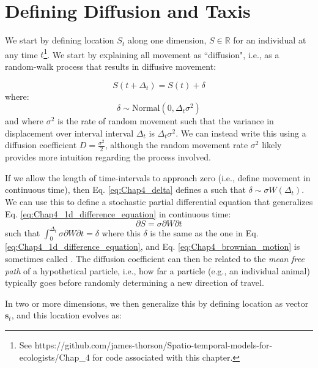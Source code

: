\section{Defining Diffusion and Taxis} \label{sec:Chap4_diffusion_and_taxis}

We start by defining location \(S_t\) along one dimension, \(S \in \mathbb{R}\) for an individual at any time \(t\)\footnote{See https://github.com/james-thorson/Spatio-temporal-models-for-ecologists/Chap\_4 for code associated with this chapter.}. We start by explaining all movement as ``diffusion", i.e., as a random-walk process that results in diffusive movement:

\begin{equation} \label{eq:Chap4_1d_difference_equation}
    S(t+\Delta_t) = S(t) + \delta    
\end{equation}
where:
\begin{equation} \label{eq:Chap4_delta}
    \delta \sim \mathrm{Normal}(0, \Delta_t \sigma^2)    
\end{equation}
and where \(\sigma^2\) is the rate of random movement such that the variance in displacement over interval interval \(\Delta_t\) is \(\Delta_t \sigma^2\).  We can instead write this using a diffusion coefficient \(D = \frac{\sigma^2}{2}\), although the random movement rate \(\sigma^2\) likely provides more intuition regarding the process involved.   

If we allow the length of time-intervals to approach zero (i.e., define movement in continuous time), then Eq. \ref{eq:Chap4_delta} defines a  such that \( \delta \sim \sigma W(\Delta_t) \).  We can use this to define a stochastic partial differential equation that generalizes Eq. \ref{eq:Chap4_1d_difference_equation} in continuous time:
\begin{equation} \label{eq:Chap4_brownian_motion}
    \partial S =  \sigma \partial W \partial t   
\end{equation}
such that \( \int_{0}^{\Delta_t} \sigma \partial W  \partial t = \delta \) where this \(\delta\) is the same as the one in Eq. \ref{eq:Chap4_1d_difference_equation}, and Eq. \ref{eq:Chap4_brownian_motion} is sometimes called .  The diffusion coefficient can then be related to the \textit{mean free path} of a hypothetical particle, i.e., how far a particle (e.g., an individual animal) typically goes before randomly determining a new direction of travel.    

In two or more dimensions, we then generalize this by defining location as vector \( \mathbf{s}_t \), and this location evolves as:

